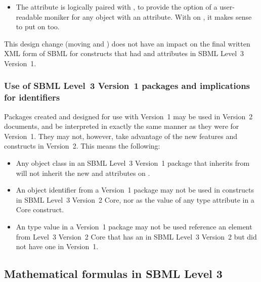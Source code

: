 \begin{blockChanged}
\begin{itemize}
\item The  attribute is logically paired with , to provide the option of a user-readable moniker for any object with an  attribute.  With  on \SBase, it makes sense to put  on \SBase too.

\end{itemize}

This design change (moving  and ) does not have an impact on the final written XML form of SBML for constructs that had  and  attributes in SBML Level~3 Version~1.


\subsubsection{Use of SBML Level~3 Version~1 packages and implications for identifiers}
\label{sec:version-1-packages-implications}

Packages created and designed for use with \sbmlthree Version~1 may be used in \sbmlthree Version~2 documents, and be interpreted in exactly the same manner as they were for Version~1.  They may not, however, take advantage of the new features and constructs in Version~2.  This means the following:
\begin{itemize}

\item Any object class in an SBML Level~3 Version~1 package that inherits from \SBase will not inherit the new  and  attributes on \SBase.

\item An object identifier from a Version~1 package may not be used in \Math constructs in SBML Level~3 Version~2 Core, nor as the value of any  type attribute in a Core construct.

\item An  type value in a Version~1 package may not be used  reference an element from Level~3 Version~2 Core that has an  in SBML Level~3 Version~2 but did not have one in Version~1.

\end{itemize}

\end{blockChanged}


\subsection{Mathematical formulas in SBML Level 3}
\label{sec:formulas}


